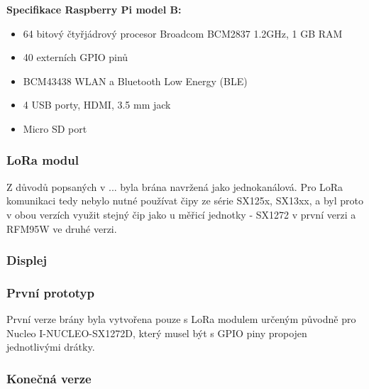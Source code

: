 \textbf{Specifikace Raspberry Pi model B:}
    \begin{itemize}
        \item 64 bitový čtyřjádrový procesor Broadcom BCM2837 1.2GHz, 1 GB RAM
        \item 40 externích GPIO pinů
        \item BCM43438 WLAN a Bluetooth Low Energy (BLE)
        \item 4 USB porty, HDMI, 3.5 mm jack
        \item Micro SD port
    \end{itemize}
    
\subsubsection{LoRa modul}
    Z důvodů popsaných v ... byla brána navržená jako jednokanálová. Pro LoRa komunikaci tedy nebylo nutné používat čipy ze série SX125x, SX13xx, a byl proto v obou verzích využit stejný čip jako u měřicí jednotky - SX1272 v první verzi a RFM95W ve druhé verzi.
    
\subsubsection{Displej}
    
 \subsubsection{První prototyp}
    První verze brány byla vytvořena pouze s LoRa modulem určeným původně pro Nucleo I-NUCLEO-SX1272D, který musel být s GPIO piny propojen jednotlivými drátky.
    

 \subsubsection{Konečná verze}
 
 
 



